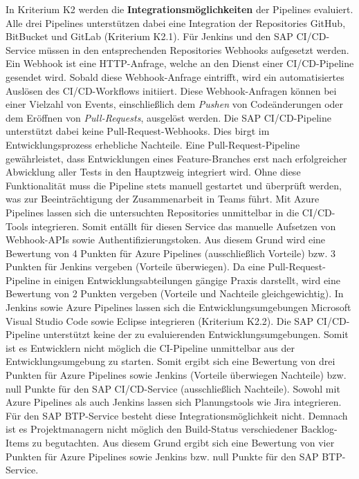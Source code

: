 In Kriterium K2 werden die \textbf{Integrationsmöglichkeiten} der Pipelines evaluiert. Alle drei Pipelines unterstützen dabei eine Integration der Repositories GitHub, BitBucket und GitLab (Kriterium K2.1). Für Jenkins und den SAP CI/CD-Service müssen in den entsprechenden Repositories Webhooks aufgesetzt werden. Ein Webhook ist eine HTTP-Anfrage, welche an den Dienst einer CI/CD-Pipeline gesendet wird. Sobald diese Webhook-Anfrage eintrifft, wird ein automatisiertes Auslösen des CI/CD-Workflows initiiert. Diese Webhook-Anfragen können bei einer Vielzahl von Events, einschließlich dem \textit{Pushen} von Codeänderungen oder dem Eröffnen von \textit{Pull-Requests}, ausgelöst werden. Die SAP CI/CD-Pipeline unterstützt dabei keine Pull-Request-Webhooks. Dies birgt im Entwicklungsprozess erhebliche Nachteile. Eine Pull-Request-Pipeline gewährleistet, dass Entwicklungen eines Feature-Branches erst nach erfolgreicher Abwicklung aller Tests in den Hauptzweig integriert wird. Ohne diese Funktionalität muss die Pipeline stets manuell gestartet und überprüft werden, was zur Beeinträchtigung der Zusammenarbeit in Teams führt. Mit Azure Pipelines lassen sich die untersuchten Repositories unmittelbar in die CI/CD-Tools integrieren. Somit entällt für diesen Service das manuelle Aufsetzen von Webhook-APIs sowie Authentifizierungstoken. Aus diesem Grund wird eine Bewertung von 4 Punkten für Azure Pipelines (ausschließlich Vorteile) bzw. 3 Punkten für Jenkins vergeben (Vorteile überwiegen). Da eine Pull-Request-Pipeline in einigen Entwicklungsabteilungen gängige Praxis darstellt, wird eine Bewertung von 2 Punkten vergeben (Vorteile und Nachteile gleichgewichtig). 
In Jenkins sowie Azure Pipelines lassen sich die Entwicklungsumgebungen Microsoft Visual Studio Code sowie Eclipse integrieren (Kriterium K2.2). Die SAP CI/CD-Pipeline unterstützt keine der zu evaluierenden Entwicklungsumgebungen. Somit ist es Entwicklern nicht möglich die CI-Pipeline unmittelbar aus der Entwicklungsumgebung zu starten. Somit ergibt sich eine Bewertung von drei Punkten für Azure Pipelines sowie Jenkins (Vorteile überwiegen Nachteile) bzw. null Punkte für den SAP CI/CD-Service (ausschließlich Nachteile). Sowohl mit Azure Pipelines als auch Jenkins lassen sich Planungstools wie Jira integrieren. Für den SAP BTP-Service besteht diese Integrationsmöglichkeit nicht. Demnach ist es Projektmanagern nicht möglich den Build-Status verschiedener Backlog-Items zu begutachten. Aus diesem Grund ergibt sich eine Bewertung von vier Punkten für Azure Pipelines sowie Jenkins  bzw. null Punkte für den SAP BTP-Service.\\
